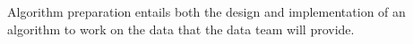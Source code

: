 \documentclass[conference]{IEEEtran}
\begin{document}
Algorithm preparation entails both the design and implementation of an algorithm to work on the data that the data team will provide.
\clearpage
%    
%    
%    
\end{document}
